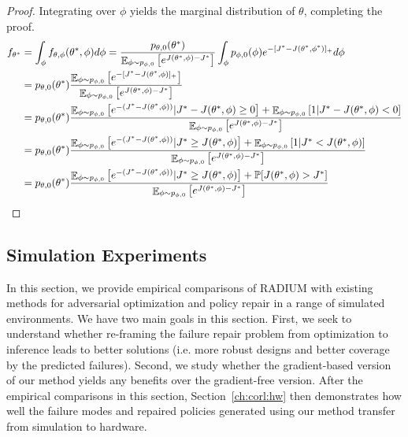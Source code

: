{\begin{proof}
    Integrating over $\phi$ yields the marginal distribution of $\theta$, completing the proof.
    \begin{align}
        f_{\theta^*} & = \int_\phi f_{\theta, \phi}(\theta^*, \phi) d\phi = \frac{p_{\theta, 0}(\theta^*)}{\mathop{\mathbb{E}}_{\phi \sim p_{\phi, 0}}\left[ e^{J(\theta^*, \phi) - J^*} \right]}  \int_\phi p_{\phi, 0}(\phi) e^{-[J^* - J(\theta^*, \phi^*)]_+} d\phi                                                                               \\
                     & = p_{\theta, 0}(\theta^*)\frac{\mathop{\mathbb{E}}_{\phi \sim p_{\phi, 0}}\left[ e^{-[J^* - J(\theta^*, \phi)]_+} \right]}{\mathop{\mathbb{E}}_{\phi \sim p_{\phi, 0}}\left[ e^{J(\theta^*, \phi) - J^*} \right]}                                                                                                                     \\
                     & = p_{\theta, 0}(\theta^*)\frac{\mathop{\mathbb{E}}_{\phi \sim p_{\phi, 0}}\left[ e^{-(J^* - J(\theta^*, \phi))} | J^* - J(\theta^*, \phi) \geq 0 \right] + \mathop{\mathbb{E}}_{\phi \sim p_{\phi, 0}}\left[ 1 | J^* - J(\theta^*, \phi) < 0 \right]}{\mathop{\mathbb{E}}_{\phi \sim p_{\phi, 0}}\left[ e^{J(\theta^*, \phi) - J^*} \right]} \\
                     & = p_{\theta, 0}(\theta^*)\frac{\mathop{\mathbb{E}}_{\phi \sim p_{\phi, 0}}\left[ e^{-(J^* - J(\theta^*, \phi))} | J^* \geq J(\theta^*, \phi) \right] + \mathop{\mathbb{E}}_{\phi \sim p_{\phi, 0}}\left[ 1 | J^* < J(\theta^*, \phi) \right]}{\mathop{\mathbb{E}}_{\phi \sim p_{\phi, 0}}\left[ e^{J(\theta^*, \phi) - J^*} \right]}         \\
                     & = p_{\theta, 0}(\theta^*)\frac{\mathop{\mathbb{E}}_{\phi \sim p_{\phi, 0}}\left[ e^{-(J^* - J(\theta^*, \phi))} | J^* \geq J(\theta^*, \phi) \right] + \mathbb{P}[J(\theta^*, \phi) > J^*]}{\mathop{\mathbb{E}}_{\phi \sim p_{\phi, 0}}\left[ e^{J(\theta^*, \phi) - J^*} \right]}                                                    \\
    \end{align}
\end{proof}

\subsection{Simulation Experiments}\label{ch:corl:experiments}

In this section, we provide empirical comparisons of RADIUM with existing methods for adversarial optimization and policy repair in a range of simulated environments. We have two main goals in this section. First, we seek to understand whether re-framing the failure repair problem from optimization to inference leads to better solutions (i.e. more robust designs and better coverage by the predicted failures). Second, we study whether the gradient-based version of our method yields any benefits over the gradient-free version. After the empirical comparisons in this section, Section~\ref{ch:corl:hw} then demonstrates how well the failure modes and repaired policies generated using our method transfer from simulation to hardware.

}
